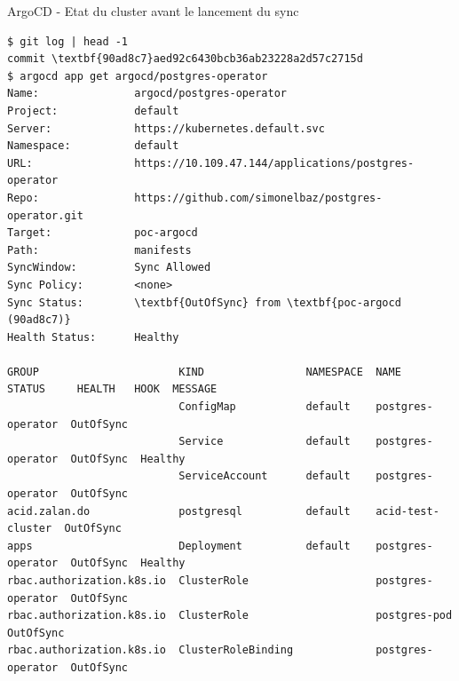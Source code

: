 
\begin{frame}[fragile]{ArgoCD - Etat du cluster avant le lancement du sync}

\begin{tiny}
\begin{Verbatim}[commandchars=\\\{\}]
$ git log | head -1
commit \textbf{90ad8c7}aed92c6430bcb36ab23228a2d57c2715d
$ argocd app get argocd/postgres-operator
Name:               argocd/postgres-operator
Project:            default
Server:             https://kubernetes.default.svc
Namespace:          default
URL:                https://10.109.47.144/applications/postgres-operator
Repo:               https://github.com/simonelbaz/postgres-operator.git
Target:             poc-argocd
Path:               manifests
SyncWindow:         Sync Allowed
Sync Policy:        <none>
Sync Status:        \textbf{OutOfSync} from \textbf{poc-argocd (90ad8c7)}
Health Status:      Healthy

GROUP                      KIND                NAMESPACE  NAME               STATUS     HEALTH   HOOK  MESSAGE
                           ConfigMap           default    postgres-operator  OutOfSync                 
                           Service             default    postgres-operator  OutOfSync  Healthy        
                           ServiceAccount      default    postgres-operator  OutOfSync                 
acid.zalan.do              postgresql          default    acid-test-cluster  OutOfSync                 
apps                       Deployment          default    postgres-operator  OutOfSync  Healthy        
rbac.authorization.k8s.io  ClusterRole                    postgres-operator  OutOfSync                 
rbac.authorization.k8s.io  ClusterRole                    postgres-pod       OutOfSync                 
rbac.authorization.k8s.io  ClusterRoleBinding             postgres-operator  OutOfSync
\end{Verbatim}
\end{tiny}

\end{frame}


